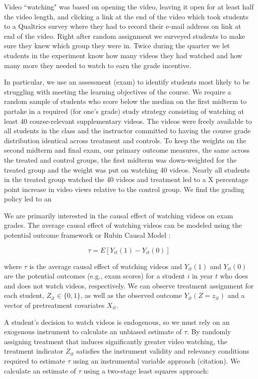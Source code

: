 \documentclass[12pt]{article}
\begin{document}
Video ``watching" was based on opening the video, leaving it open for at least half the video length, and clicking a link at the end of the video which took students to a Qualtrics survey where they had to record their e-mail address on link at end of the video. Right after random assignment we surveyed students to make sure they knew which group they were in. Twice during the quarter we let students in the experiment know how many videos they had watched and how many more they needed to watch to earn the grade incentive.

In particular, we use an assessment (exam) to identify students most likely to be struggling with meeting the learning objectives of the course. We require a random sample of students who score below the median on the first midterm to partake in a required (for one's grade) study strategy consisting of watching at least 40 course-relevant supplementary videos. The videos were freely available to all students in the class and the instructor committed to having the course grade distribution identical across treatment and controls. To keep the weights on the second midterm and final exam, our primary outcome measures, the same across the treated and control groups, the first midterm was down-weighted for the treated group and the weight was put on watching 40 videos. Nearly all students in the treated group watched the 40 videos and treatment led to a X percentage point increase in video views relative to the control group. We find the grading policy led to an



We are primarily interested in the causal effect of watching videos on exam grades. The average causal effect of watching videos can be modeled using the potential outcome framework or Rubin Causal Model \parencite{ir2015}:

\begin{equation}
	\tau = E[Y_{it}(1) - Y_{it}(0)]
\end{equation}

where $\tau$ is the average causal effect of watching videos and $Y_{it}(1)$ and $Y_{it}(0)$ are the potential outcomes (e.g., exam scores) for a student $i$ in year $t$ who does and does not watch videos, respectively. We can observe treatment assignment for each student, $Z_{it} \in \{0,1\}$, as well as the observed outcome $Y_{it}(Z=z_{it})$ and a vector of pretreatment covariates $X_{it}$.

A student's decision to watch videos is endogenous, so we must rely on an exogenous instrument to calculate an unbiased estimate of $\tau$. By randomly assigning treatment that induces significantly greater video watching, the treatment indicator $Z_{it}$ satisfies the instrument validity and relevancy conditions required to estimate $\tau$ using an instrumental variable approach (citation). We calculate an estimate of $\tau$ using a two-stage least squares approach:
\end{document}
